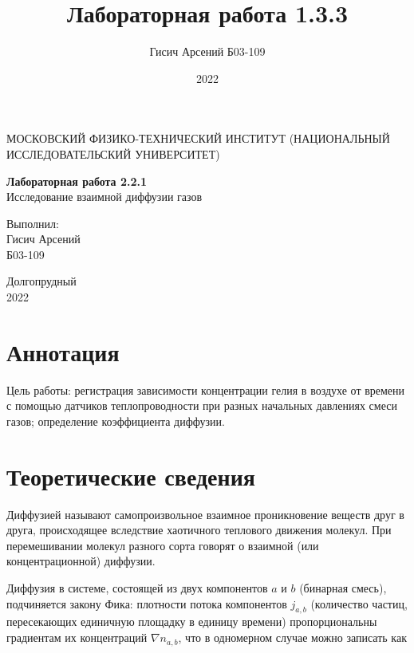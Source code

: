 \documentclass[a4paper, 12pt]{article}
\title{Лабораторная работа 1.3.3}
\author{Гисич Арсений Б03-109}
\date{2022}
\begin{document}
	\begin{center}
		{\large МОСКОВСКИЙ ФИЗИКО-ТЕХНИЧЕСКИЙ ИНСТИТУТ (НАЦИОНАЛЬНЫЙ ИССЛЕДОВАТЕЛЬСКИЙ УНИВЕРСИТЕТ)}
	\end{center}
	\vspace{5 cm}
	{\Large
		\begin{center}
			{\bf Лабораторная работа 2.2.1}\\[0.2 cm]
			Исследование взаимной диффузии газов
		\end{center}
	}
	\vspace{4 cm}
	\begin{flushright}
		{\Large Выполнил: \\
			\vspace{0.2 cm}
			Гисич Арсений \\
			\vspace{0.2 cm}
			Б03-109 \\}
	\end{flushright}
	\vspace{9 cm}
	\begin{center}
		Долгопрудный\\[0.1 cm]
		2022
	\end{center}
\thispagestyle{empty}

\section{Аннотация}

\par Цель работы: регистрация зависимости концентрации гелия в воздухе от времени с помощью датчиков теплопроводности при разных начальных давлениях смеси газов; определение коэффициента диффузии.

\section{Теоретические сведения}

Диффузией называют самопроизвольное взаимное проникновение веществ друг в друга, происходящее вследствие хаотичного теплового движения молекул. При перемешивании молекул разного сорта говорят о взаимной (или концентрационной) диффузии.

Диффузия в системе, состоящей из двух компонентов $ a $ и $ b $ (бинарная смесь), подчиняется закону Фика: плотности потока компонентов $ j_{a,b} $ (количество частиц, пересекающих единичную площадку в единицу времени) пропорциональны градиентам их концентраций $ \nabla n_{a,b}$, что в одномерном случае можно записать как
\end{document}
